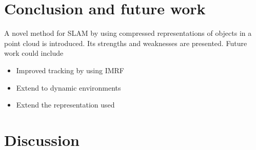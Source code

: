 \documentclass[twoside,hidelinks]{article}
\begin{document}
\section{Conclusion and future work}
\label{sec:discussion}

A novel method for SLAM by using compressed representations of objects in a point cloud is introduced. Its strengths and weaknesses are presented. Future work could include
\begin{itemize}
    \item Improved tracking by using IMRF
    \item Extend to dynamic environments
    \item Extend the representation used
\end{itemize}

\section{Discussion}
\end{document}

